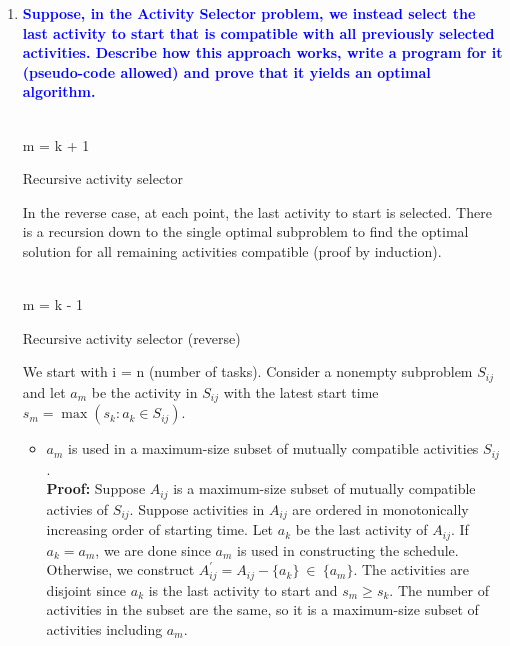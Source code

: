 \documentclass[11pt]{article}
\begin{document}
\begin{enumerate}
\item  \textbf{\textcolor{blue}{Suppose, in the Activity Selector problem, we
instead select the last activity to start that is compatible with all previously
selected activities. Describe how this approach works, write a program for it 
(pseudo-code allowed) and prove that it yields an optimal algorithm.}}
    \\ 
    \begin{algorithm}[H]
        \Indm{}\\
        \Indp
            m = k + 1 \\
        \caption{Recursive activity selector}
    \end{algorithm}
    In the reverse case, at each point, the last activity to start is selected. There is a recursion down to the single optimal subproblem to find the optimal solution for all remaining activities compatible (proof by induction). \\
    \begin{algorithm}[H]
        \Indm{}\\
        \Indp
            m = k - 1 \\
        \caption{Recursive activity selector (reverse)}
    \end{algorithm}
    We start with i = n (number of tasks). Consider a nonempty subproblem $S_{ij}$ and let $a_m$ be the activity in $S_{ij}$ with the latest start time $s_m = \max(s_k : a_k \in S_{ij})$.
    \begin{itemize}
        \item $a_m$ is used in a maximum-size subset of mutually compatible activities $S_{ij}$.
        \\ \textbf{Proof: } Suppose $A_{ij}$ is a maximum-size subset of mutually compatible activies of $S_{ij}$. Suppose activities in $A_{ij}$ are ordered in monotonically increasing order of starting time. Let $a_k$ be the last activity of $A_{ij}$. If $a_k = a_m$, we are done since $a_m$ is used in constructing the schedule. Otherwise, we construct $A^{'}_{ij} = A_{ij} - \{a_k\}\ \in \ \{a_m\}$. The activities are disjoint since $a_k$ is the last activity to start and $s_m \geq s_k$. The number of activities in the subset are the same, so it is a maximum-size subset of activities including $a_m$.

\end{itemize}
\end{enumerate}
\end{document}
